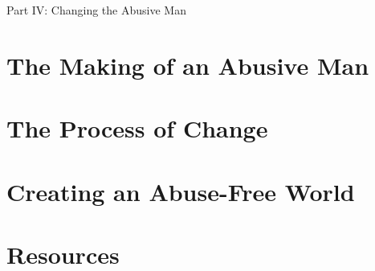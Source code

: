 \documentclass[oneside]{article}
\numberwithin{equation}{section}
\begin{document}
\begin{center}
    Part IV: Changing the Abusive Man
\end{center}

\section{The Making of an Abusive Man}

\section{The Process of Change}

\section{Creating an Abuse-Free World}

\section*{Resources}


\printbibliography[heading=bibintoc]
\end{document}
